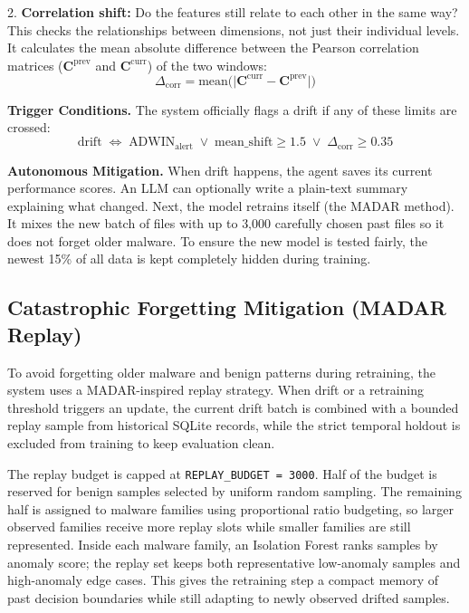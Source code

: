 \documentclass[letterpaper,10pt,conference]{ieeeconf}
\begin{document}
2. \textbf{Correlation shift:} Do the features still relate to each other in the same way? This checks the relationships between dimensions, not just their individual levels. It calculates the mean absolute difference between the Pearson correlation matrices ($\mathbf{C}^{\mathrm{prev}}$ and $\mathbf{C}^{\mathrm{curr}}$) of the two windows:
\begin{equation}
    \Delta_{\mathrm{corr}} = \mathrm{mean}\bigl(\bigl|\mathbf{C}^{\mathrm{curr}} - \mathbf{C}^{\mathrm{prev}}\bigr|\bigr)
\end{equation}

\textbf{Trigger Conditions.}
The system officially flags a drift if any of these limits are crossed:
\begin{equation}
    \text{drift} \;\Leftrightarrow\; \text{ADWIN}_{\mathrm{alert}} \;\lor\; \mathrm{mean\_shift} \ge 1.5 \;\lor\; \Delta_{\mathrm{corr}} \ge 0.35
\end{equation}

\textbf{Autonomous Mitigation.} 
When drift happens, the agent saves its current performance scores. An LLM can optionally write a plain-text summary explaining what changed. Next, the model retrains itself (the MADAR method). It mixes the new batch of files with up to 3,000 carefully chosen past files so it does not forget older malware. To ensure the new model is tested fairly, the newest 15\% of all data is kept completely hidden during training.

\subsection{Catastrophic Forgetting Mitigation (MADAR Replay)}
To avoid forgetting older malware and benign patterns during retraining, the system uses a MADAR-inspired replay strategy. When drift or a retraining threshold triggers an update, the current drift batch is combined with a bounded replay sample from historical SQLite records, while the strict temporal holdout is excluded from training to keep evaluation clean.

The replay budget is capped at \texttt{REPLAY\_BUDGET = 3000}. Half of the budget is reserved for benign samples selected by uniform random sampling. The remaining half is assigned to malware families using proportional ratio budgeting, so larger observed families receive more replay slots while smaller families are still represented. Inside each malware family, an Isolation Forest ranks samples by anomaly score; the replay set keeps both representative low-anomaly samples and high-anomaly edge cases. This gives the retraining step a compact memory of past decision boundaries while still adapting to newly observed drifted samples.
\end{document}
